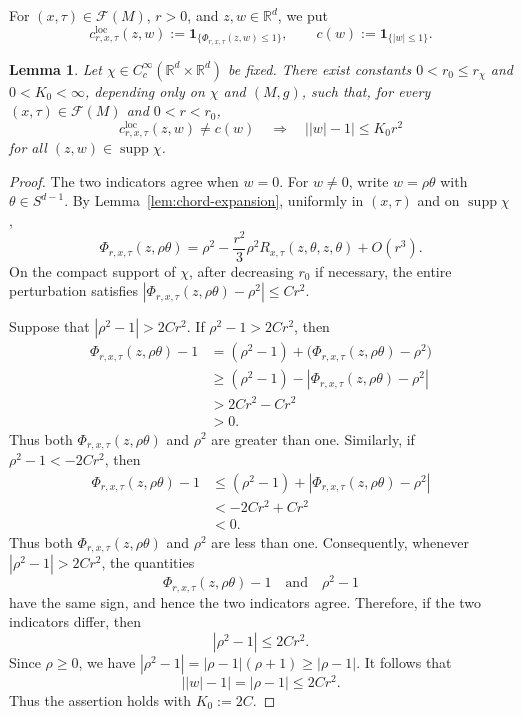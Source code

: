 \documentclass[11pt]{article}
\newtheorem{lemma}[theorem]{Lemma}
\theoremstyle{remark}
\newcommand{\R}{\mathbb R}
\newcommand{\ind}{\mathbf 1}
\numberwithin{equation}{section}
\begin{document}
For $(x,\tau)\in\mathcal F(M)$, $r>0$, and
$z,w\in\mathbb R^d$, we put 
\[
c_{r,x,\tau}^{\mathrm{loc}}(z,w)
:=
\ind_{\{\Phi_{r,x,\tau}(z,w)\le1\}},
\qquad
c(w):=\ind_{\{|w|\le1\}}.
\]

\begin{lemma}
\label{lem:moving-shell}
Let $\chi\in C_c^\infty(\R^d\times\R^d)$ be fixed.
There exist constants
$0<r_0\le r_\chi$ and $0<K_0<\infty$, depending only on
$\chi$ and $(M,g)$, such that, for every
$(x,\tau)\in\mathcal F(M)$ and $0<r<r_0$,
\[
c_{r,x,\tau}^{\mathrm{loc}}(z,w)\ne c(w)
\quad\Longrightarrow\quad
\bigl||w|-1\bigr|\le K_0r^2
\]
for all $(z,w)\in\operatorname{supp}\chi$.
\end{lemma}

\begin{proof}
The two indicators agree when $w=0$.  For $w\ne0$, write
$w=\rho\theta$ with $\theta\in S^{d-1}$.  By
Lemma~\ref{lem:chord-expansion}, uniformly in $(x,\tau)$ and on
$\operatorname{supp}\chi$,
\[
\Phi_{r,x,\tau}(z,\rho\theta)
=\rho^2-\frac{r^2}{3}\rho^2R_{x,\tau}(z,\theta,z,\theta)+O(r^3).
\]
On the compact support of $\chi$, after decreasing $r_0$ if necessary, the
entire perturbation satisfies
$|\Phi_{r,x,\tau}(z,\rho\theta)-\rho^2|\le Cr^2$.

Suppose that $|\rho^2-1|>2Cr^2$.
If $\rho^2-1>2Cr^2$,
then
\[
\begin{aligned}
\Phi_{r,x,\tau}(z,\rho\theta)-1
&=
(\rho^2-1)
+
\bigl(
\Phi_{r,x,\tau}(z,\rho\theta)-\rho^2
\bigr)\\
&\ge
(\rho^2-1)
-
\left|
\Phi_{r,x,\tau}(z,\rho\theta)-\rho^2
\right|\\
&>
2Cr^2-Cr^2\\
&>0.
\end{aligned}
\]
Thus both $\Phi_{r,x,\tau}(z,\rho\theta)$ and $\rho^2$ are greater
than one.
Similarly, if $\rho^2-1<-2Cr^2$,
then
\[
\begin{aligned}
\Phi_{r,x,\tau}(z,\rho\theta)-1
&\le
(\rho^2-1)
+
\left|
\Phi_{r,x,\tau}(z,\rho\theta)-\rho^2
\right|\\
&<
-2Cr^2+Cr^2\\
&<0.
\end{aligned}
\]
Thus both $\Phi_{r,x,\tau}(z,\rho\theta)$ and $\rho^2$ are less than
one.
Consequently, whenever $|\rho^2-1|>2Cr^2$,
the quantities
\[
\Phi_{r,x,\tau}(z,\rho\theta)-1
\quad\text{and}\quad
\rho^2-1
\]
have the same sign, and hence the two indicators agree.  Therefore,
if the two indicators differ, then
\[
|\rho^2-1|\le2Cr^2.
\]
Since $\rho\ge0$, we have
$|\rho^2-1|
=
|\rho-1|(\rho+1)
\ge
|\rho-1|$.
It follows that
\[
\bigl||w|-1\bigr|
=
|\rho-1|
\le
2Cr^2.
\]
Thus the assertion holds with $K_0:=2C$.
\end{proof}
\end{document}
